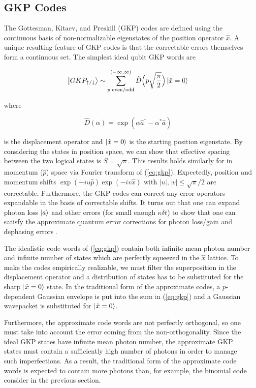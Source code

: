 \documentclass[12]{amsart}
\newcommand\0{\mathbf{0}}
\newcommand\<{\langle}
\renewcommand\>{\rangle}
\begin{document}
\subsection{GKP Codes}

The Gottesman, Kitaev, and Preskill (GKP) codes \cite{gottesman2001encoding} are defined using the continuous basis of non-normalizable eigenstates of the position operator $\hat{x}$. A unique resulting feature of GKP codes is that the correctable errors themselves form a continuous set. The simplest ideal qubit GKP words are

\begin{align}
\label{eq:gkp}
\ket{GKP_{\uparrow/\downarrow}} \sim \sum_{p\text{ even/odd}}^{(-\infty, \infty)} \hat{D}\Big(p \sqrt{\frac{\pi}{2}} \Big) \ket{\hat{x} = 0} 	
\end{align}


  where 
  
  $$\hat{D}(\alpha) = \exp(\alpha \hat{a}^\dag - \alpha^* \hat{a})$$
  
  is the displacement operator and $\ket{\hat{x} = 0}$ is the starting position eigenstate. By considering the states in position space, we can show that effective spacing between the two logical states is $S=\sqrt{\pi}$. This results holds similarly for in momentum ($\hat{p}$) space via Fourier transform of (\ref{eq:gkp}). Expectedly, position and momentum shifts $\exp(-iu\hat{p})\exp(-iv\hat{x})$ with $|u|, |v| \leq \sqrt{\pi}/2$ are correctable. Furthermore, the GKP codes can correct any error operators expandable in the basis of correctable shifts. It turns out that one can expand photon loss $\ket{a}$ and other errors (for small enough $\kappa \delta t$) to show that one can satisfy the approximate quantum error corrections for photon loss/gain and dephasing errors \cite{michael2016new}.
  
The idealistic code words of (\ref{eq:gkp}) contain both infinite mean photon number and infinite number of states which are perfectly squeezed in the $\hat{x}$ lattice. To make the codes empirically realizable, we must filter the superposition in the displacement operator and a distribution of states has to be substituted for the sharp $\ket{\hat{x}=0}$ state. In the traditional form of the approximate codes, a $p$-dependent Gaussian envelope is put into the sum in (\ref{eq:gkp}) and a Gaussian wavepacket is substituted for $\ket{\hat{x}=0}$. 

Furthermore, the approximate code words are not perfectly orthogonal, so one must take into account the error coming from the non-orthogonality. Since the ideal GKP states have infinite mean photon number, the approximate GKP states must contain a sufficiently high number of photons in order to manage such imperfections. As a result, the traditional form of the approximate code words is expected to contain more photons than, for example, the binomial code consider in the previous section.
\end{document}
